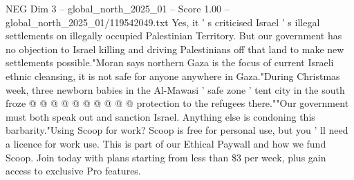 \begin{textsample}{NEG Dim 3 – global\_north\_2025\_01 – Score 1.00 – global\_north\_2025\_01/119542049.txt}
Yes, it ' s criticised Israel ' s illegal settlements on illegally occupied Palestinian Territory.
But our government has no objection to Israel killing and driving Palestinians off that land to make new settlements possible."Moran says northern Gaza is the focus of current Israeli ethnic cleansing, it is not safe for anyone anywhere in Gaza."During Christmas week, three newborn babies in the Al-Mawasi ' safe zone ' tent city in the south froze @ @ @ @ @ @ @ @ @ @ protection to the refugees there.""Our government must both speak out and sanction Israel.
Anything else is condoning this barbarity."Using Scoop for work?
Scoop is free for personal use, but you ' ll need a licence for work use.
This is part of our Ethical Paywall and how we fund Scoop.
Join today with plans starting from less than \$3 per week, plus gain access to exclusive Pro features.

\end{textsample}
